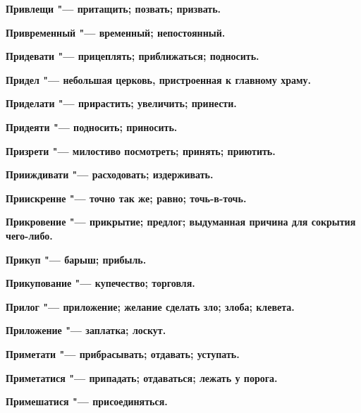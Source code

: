 \begin{mymulticols}{2}
\bfseries Привлещи\normalfont{} "--- притащить; позвать; призвать. 




\bfseries Привременный\normalfont{} "--- временный; непостоянный. 




\bfseries Придевати\normalfont{} "--- прицеплять; приближаться; подносить. 




\bfseries Придел\normalfont{} "--- небольшая церковь, пристроенная к главному храму. 




\bfseries Приделати\normalfont{} "--- прирастить; увеличить; принести. 




\bfseries Придеяти\normalfont{} "--- подносить; приносить. 




\bfseries Призрети\normalfont{} "--- милостиво посмотреть; принять; приютить. 




\bfseries Прииждивати\normalfont{} "--- расходовать; издерживать. 




\bfseries Приискренне\normalfont{} "--- точно так же; равно; точь-в-точь. 




\bfseries Прикровение\normalfont{} "--- прикрытие; предлог; выдуманная причина для сокрытия чего-либо. 




\bfseries Прикуп\normalfont{} "--- барыш; прибыль. 




\bfseries Прикупование\normalfont{} "--- купечество; торговля. 




\bfseries Прилог\normalfont{} "--- приложение; желание сделать зло; злоба; клевета. 




\bfseries Приложение\normalfont{} "--- заплатка; лоскут. 




\bfseries Приметати\normalfont{} "--- прибрасывать; отдавать; уступать. 




\bfseries Приметатися\normalfont{} "--- припадать; отдаваться; лежать у порога. 




\bfseries Примешатися\normalfont{} "--- присоединяться. 





\end{mymulticols}
